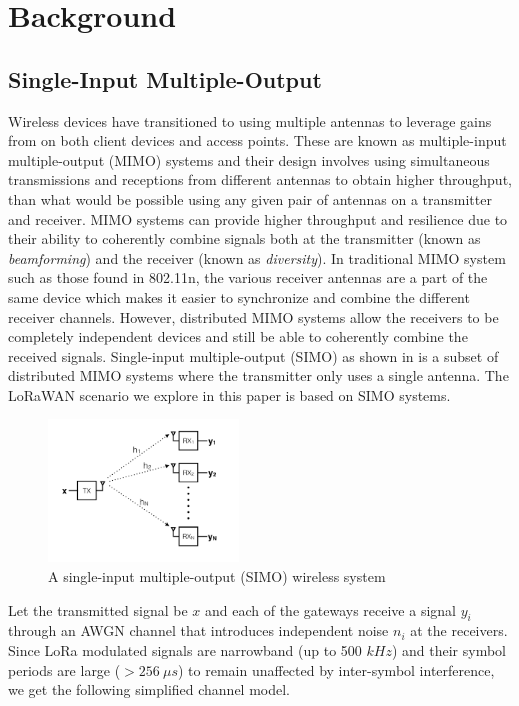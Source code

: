 \section{Background}
\label{sec:background}

\subsection{Single-Input Multiple-Output}
\label{sec:simo}

Wireless devices have transitioned to using multiple antennas to leverage
gains from on both client devices and access points. These are known as
multiple-input multiple-output (MIMO) systems and their design involves using
simultaneous transmissions and receptions from different antennas to obtain
higher throughput, than what would be possible using any given pair of
antennas on a transmitter and receiver. MIMO systems can provide higher
throughput and resilience due to their ability to coherently combine signals
both at the transmitter (known as \textit{beamforming}) and the receiver
(known as \textit{diversity}). In traditional MIMO system such as those found
in 802.11n, the various receiver antennas are a part of the same device which
makes it easier to synchronize and combine the different receiver channels.
However, distributed MIMO systems allow the receivers to be completely
independent devices and still be able to coherently combine the received
signals. Single-input multiple-output (SIMO) as shown in  is a
subset of distributed MIMO systems where the transmitter only uses a single
antenna. The LoRaWAN scenario we explore in this paper is based on SIMO
systems.

\begin{figure}[!htb]
    \centering
    \includegraphics[width=0.45\textwidth]{figures/SIMO}
    \caption{A single-input multiple-output (SIMO) wireless system}
    \label{fig:simo}
\end{figure}

Let the transmitted signal be $x$ and each of the gateways receive a signal
$y_i$ through an AWGN channel that introduces independent noise $n_i$ at the
receivers. Since LoRa modulated signals are narrowband (up to 500 $kHz$) and
their symbol periods are large ($> 256~\mu s$) to remain
unaffected by inter-symbol interference, we get the following simplified
channel model.

